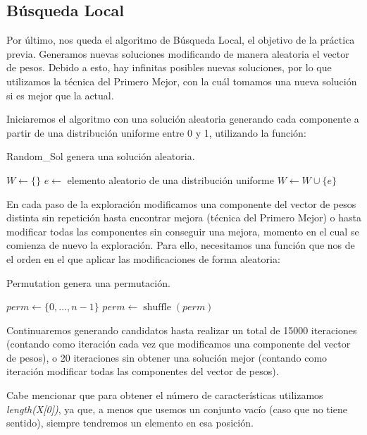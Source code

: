 \documentclass[11pt,a4paper]{article}
\begin{document}
\subsection{Búsqueda Local}

Por último, nos queda el algoritmo de Búsqueda Local, el objetivo de la práctica previa. Generamos nuevas soluciones modificando de manera aleatoria el vector de pesos. Debido a esto, hay infinitas posibles nuevas soluciones, por lo que utilizamos la técnica del Primero Mejor, con la cuál tomamos una nueva solución si es mejor que la actual.

Iniciaremos el algoritmo con una solución aleatoria generando cada componente a partir de una distribución uniforme entre 0 y 1, utilizando la función: \\
\begin{algorithm}[H]
	\caption{{\sc Random\_Sol} genera una solución aleatoria.}
	
	$W \gets \{\}$ \;
	 {
		$e \gets$ elemento aleatorio de una distribución uniforme \;
		$W \gets W \cup \{e\}$ \;
	}
	 \;
\end{algorithm}

En cada paso de la exploración modificamos una componente del vector de pesos distinta sin repetición hasta encontrar mejora (técnica del Primero Mejor) o hasta modificar todas las componentes sin conseguir una mejora, momento en el cual se comienza de nuevo la exploración. Para ello, necesitamos una función que nos de el orden en el que aplicar las modificaciones de forma aleatoria: \\
\begin{algorithm}[H]
	\caption{{\sc Permutation} genera una permutación.}
	
	$perm \gets \{0, \dots, n-1\}$ \;
	$perm \gets \operatorname{shuffle}(perm)$ \;
	 \;
\end{algorithm}

Continuaremos generando candidatos hasta realizar un total de 15000 iteraciones (contando como iteración cada vez que modificamos una componente del vector de pesos), o 20 iteraciones sin obtener una solución mejor (contando como iteración modificar todas las componentes del vector de pesos).

Cabe mencionar que para obtener el número de características utilizamos \emph{length(X[0])}, ya que, a menos que usemos un conjunto vacío (caso que no tiene sentido), siempre tendremos un elemento en esa posición.
\end{document}
